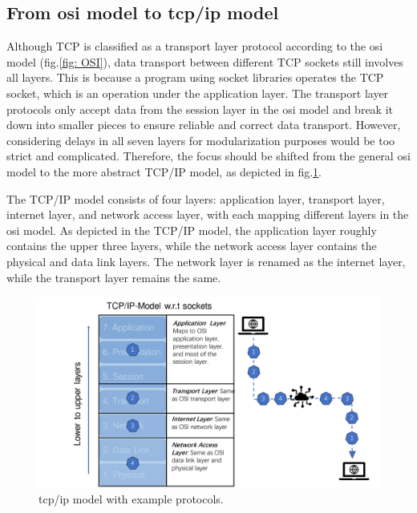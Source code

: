 \subsection{From \gls{osi} model to \gls{tcp/ip} model}

Although TCP is classified as a transport layer protocol according to the 
\gls{osi} model (fig.\ref{fig: OSI}), data transport between different TCP sockets 
still involves all layers. This is because a program using socket libraries 
operates the TCP socket, which is an operation under the application layer. 
The transport layer protocols only accept data from the session layer in the 
\gls{osi} model and break it down into smaller pieces to ensure reliable and correct 
data transport. However, considering delays in all seven layers for modularization 
purposes would be too strict and complicated. Therefore, the focus should be 
shifted from the general \gls{osi} model to the more abstract TCP/IP model, as depicted 
in fig.\ref{fig: TCP_IP}.

The TCP/IP model consists of four layers: application layer, transport layer, 
internet layer, and network access layer, with each mapping different layers in 
the \gls{osi} model. As depicted in the TCP/IP model, the application layer roughly 
contains the upper three layers, while the network access layer contains the 
physical and data link layers. The network layer is renamed as the internet 
layer, while the transport layer remains the same.

\begin{figure}[htb]
    \includegraphics[width=\textwidth]{figures/TCP_IP.pdf}
    
    \centering
    \caption{\gls{tcp/ip} model with example protocols. \label{fig: TCP_IP}}
\end{figure}

